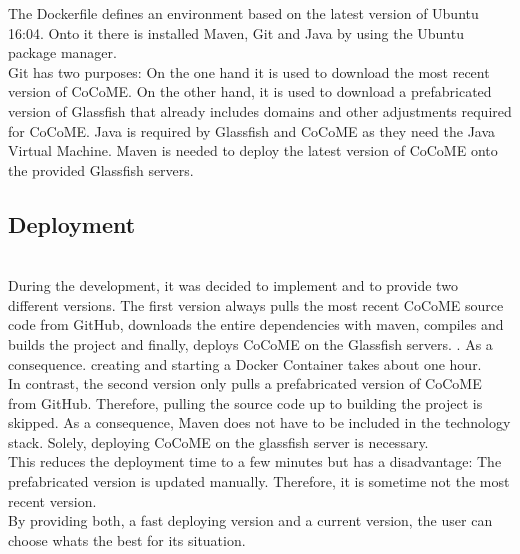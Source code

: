 	The Dockerfile defines an environment based on the latest version of Ubuntu 16:04. Onto it there is installed Maven, Git and Java by using the Ubuntu package manager.\\
	Git has two purposes: On the one hand it is used to download the most recent version of CoCoME.	On the other hand, it is used to download a prefabricated version of Glassfish that already includes domains and other adjustments required for CoCoME. Java is required by Glassfish and CoCoME as they need the Java Virtual Machine. Maven is needed to deploy the latest version of CoCoME onto the provided Glassfish servers.
	
	
	\subsection{Deployment}\hfil \\
	During the development, it was decided to implement and to provide two different versions. The first version always pulls the most recent CoCoME source code from GitHub, downloads the entire dependencies with maven, compiles and builds the project and finally, deploys CoCoME on the Glassfish servers. . As a consequence. creating and starting a Docker Container takes about one hour.\\
	In contrast, the second version only  pulls a prefabricated version of CoCoME from GitHub. Therefore, pulling the source code up to building the project is skipped. As a consequence, Maven does not have to be included in the technology stack. Solely, deploying CoCoME on the glassfish server is necessary.\\
	This reduces the deployment time to a few minutes but has a disadvantage: The prefabricated version is updated manually. Therefore, it is sometime not the most recent version.\\
	By providing both, a fast deploying version and a current version, the user can choose whats the best for its situation.
	
